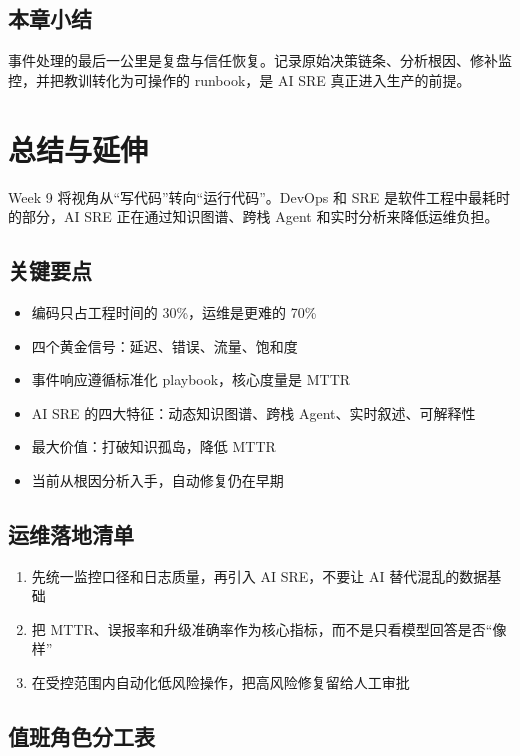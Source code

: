 \documentclass[a4paper]{article}
\begin{document}
\subsection{本章小结}

事件处理的最后一公里是复盘与信任恢复。记录原始决策链条、分析根因、修补监控，并把教训转化为可操作的 runbook，是 AI SRE 真正进入生产的前提。

\section{总结与延伸}

Week 9 将视角从``写代码''转向``运行代码''。DevOps 和 SRE 是软件工程中最耗时的部分，AI SRE 正在通过知识图谱、跨栈 Agent 和实时分析来降低运维负担。

\subsection{关键要点}

\begin{itemize}
    \item 编码只占工程时间的 30\%，运维是更难的 70\%
    \item 四个黄金信号：延迟、错误、流量、饱和度
    \item 事件响应遵循标准化 playbook，核心度量是 MTTR
    \item AI SRE 的四大特征：动态知识图谱、跨栈 Agent、实时叙述、可解释性
    \item 最大价值：打破知识孤岛，降低 MTTR
    \item 当前从根因分析入手，自动修复仍在早期
\end{itemize}

\subsection{运维落地清单}

\begin{enumerate}
    \item 先统一监控口径和日志质量，再引入 AI SRE，不要让 AI 替代混乱的数据基础
    \item 把 MTTR、误报率和升级准确率作为核心指标，而不是只看模型回答是否“像样”
    \item 在受控范围内自动化低风险操作，把高风险修复留给人工审批
\end{enumerate}

\subsection{值班角色分工表}
\end{document}
